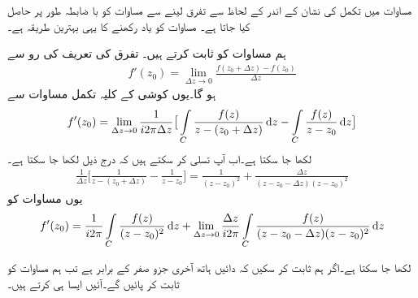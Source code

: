  مساوات  میں تکمل کی نشان کے اندر  کے لحاظ سے تفرق لینے سے مساوات   کو با ضابطہ طور پر حاصل کیا جاتا ہے۔ مساوات   کو یاد رکھنے کا یہی بہترین طریقہ ہے۔

\quad
ہم مساوات  کو ثابت کرتے ہیں۔ تفرق کی تعریف کی رو سے
\begin{align*}
f'(z_0)=\lim_{\Delta z\to 0} \frac{f(z_0+\Delta z)-f(z_0)}{\Delta z}
\end{align*}
ہو گا۔یوں کوشی کے کلیہ تکمل مساوات  سے
\begin{align}\label{مساوات_مخلوط_تکمل_تحلیلی_تفاعل_تفرق_پ}
f'(z_0)=\lim_{\Delta z \to 0} \frac{1}{i2\pi \Delta z}\big[\int\limits_C\frac{f(z)}{z-(z_0+\Delta z)}\dif z-\int\limits_C\frac{f(z)}{z-z_0}\dif z  \big]   
\end{align}
لکھا جا سکتا ہے۔اب آپ تسلی کر سکتے ہیں کہ درج ذیل لکھا جا سکتا ہے۔
\begin{align*}
\frac{1}{\Delta z}\big[\frac{1}{z-(z_0+\Delta z)}-\frac{1}{z-z_0}\big]=\frac{1}{(z-z_0)^2}+\frac{\Delta z}{(z-z_0-\Delta z)(z-z_0)^2}
\end{align*}
یوں مساوات  کو
\begin{align*}
f'(z_0)=\frac{1}{i2\pi}\int\limits_C \frac{f(z)}{(z-z_0)^2}\dif z+\lim_{\Delta z\to 0}\frac{\Delta z}{i2\pi}\int\limits_C\frac{f(z)}{(z-z_0-\Delta z)(z-z_0)^2}\dif z
\end{align*}

لکھا جا سکتا ہے۔اگر ہم ثابت کر سکیں کہ دائیں ہاتھ آخری جزو صفر کے برابر ہے تب ہم مساوات  کو ثابت کر پائیں گے۔آئیں ایسا ہی کرتے ہیں۔

